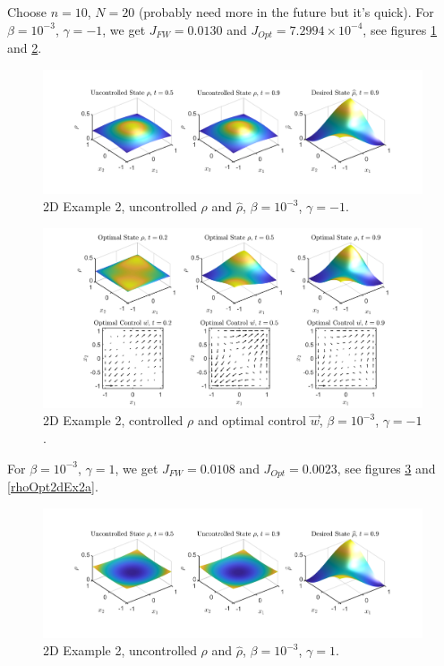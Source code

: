 \documentclass[11pt, a4paper]{article}
\theoremstyle{definition}
\begin{document}
Choose $n = 10$, $N = 20$ (probably need more in the future but it's quick).
For $\beta = 10^{-3}$, $\gamma = -1$, we get $J_{FW} = 0.0130$ and $J_{Opt} = 7.2994 \times 10^{-4}$, see figures \ref{rhoHat2dEx2} and \ref{rhoOpt2dEx2}.
\begin{figure}[h]
	\includegraphics[scale=0.3]{Res1Ex2.png}
	\caption{2D Example 2, uncontrolled $\rho$ and $\widehat \rho$, $\beta = 10^{-3}$, $\gamma = -1$.}
	\label{rhoHat2dEx2}
\end{figure}
\begin{figure}[h]
	\includegraphics[scale=0.3]{Res2Ex2.png}
	\caption{2D Example 2, controlled $\rho$ and optimal control $\vec{w}$, $\beta = 10^{-3}$, $\gamma = -1$.}
	\label{rhoOpt2dEx2}
\end{figure}
For $\beta = 10^{-3}$, $\gamma = 1$, we get $J_{FW} = 0.0108$ and $J_{Opt} = 0.0023$, see figures \ref{rhoHat2dEx2a} and \ref{rhoOpt2dEx2a}.
\begin{figure}[h]
	\includegraphics[scale=0.3]{Res1Ex2a.png}
	\caption{2D Example 2, uncontrolled $\rho$ and $\widehat \rho$, $\beta = 10^{-3}$, $\gamma = 1$.}
	\label{rhoHat2dEx2a}
\end{figure}
\end{document}
